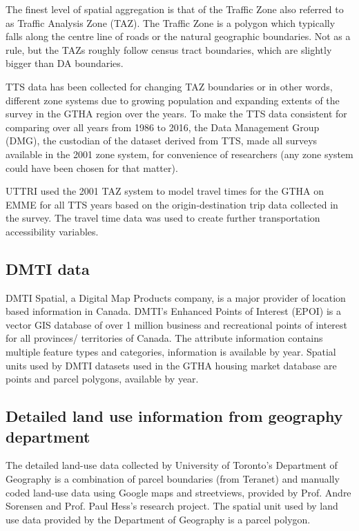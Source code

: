 The finest level of spatial aggregation is that of the Traffic Zone also referred to as Traffic Analysis Zone (TAZ).
The Traffic Zone is a polygon which typically falls along the centre line of roads or the natural geographic boundaries\cite{DataManagementGroup2019}.
Not as a rule, but the TAZs roughly follow census tract boundaries, which are slightly bigger than DA boundaries.

TTS data has been collected for changing TAZ boundaries or in other words, different zone systems due to growing population and expanding extents of the survey in the GTHA region over the years.
To make the TTS data consistent for comparing over all years from 1986 to 2016, the Data Management Group (DMG), the custodian of the dataset derived from TTS, made all surveys available in the 2001 zone system, for convenience of researchers (any zone system could have been chosen for that matter).

UTTRI used the 2001 TAZ system to model travel times for the GTHA on EMME for all TTS years based on the origin-destination trip data collected in the survey.
The travel time data was used to create further transportation accessibility variables.

\subsection{DMTI data} \label{subsec:dmti_data}

DMTI Spatial, a Digital Map Products company, is a major provider of location based information in Canada.
DMTI's Enhanced Points of Interest (EPOI) is a vector GIS database of over 1 million business and recreational points of interest for all provinces/ territories of Canada.
The attribute information contains multiple feature types and categories, information is available by year.
Spatial units used by DMTI datasets used in the GTHA housing market database are points and parcel polygons, available by year.

\subsection{Detailed land use information from geography department} \label{subsec:detailed_land_use_from_geogrpahy_department}

The detailed land-use data collected by University of Toronto's Department of Geography is a combination of parcel boundaries (from Teranet) and manually coded land-use data using Google maps and streetviews, provided by Prof.
Andre Sorensen and Prof.
Paul Hess's research project.
The spatial unit used by land use data provided by the Department of Geography is a parcel polygon.

